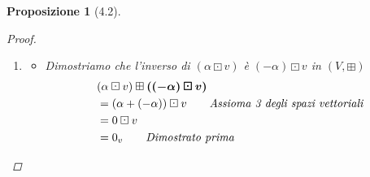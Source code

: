 \documentclass[11pt,a4paper]{article}
\theoremstyle{manuale}
\newtheorem*{proposizione}{Proposizione}
\theoremstyle{manualecorsivo}
\newcommand{\motivo}[1]{\tag*{\textit{#1}}}
\begin{document}
\begin{proposizione}[4.2]
\begin{proof}
\begin{enumerate}[label=\roman*)]
				Adesso dimostriamo che $\alpha \boxdot 0_v = 0_v$ \\
				\begin{align*}
					&\alpha \boxdot v \\
					& = \alpha \boxdot (v \boxplus 0_v) \motivo{$0_v$ è elemento neutro per def.} \\
					& = (\alpha \boxdot v) \boxplus (\alpha \boxdot 0_v) \motivo{Assioma 3 degli spazi vettoriali} \\
					& = (\alpha \boxdot 0_v) \boxplus (\alpha \boxdot v)  \motivo{$(V,\boxplus)$ è un gruppo abeliano}
				\end{align*}
				Ciò implica che $\alpha \boxdot v = (\alpha \boxdot v) \boxplus (\alpha \boxdot 0_v) = (\alpha \boxdot 0_v) \boxplus (\alpha \boxdot v) $. Pertanto $\alpha \boxdot 0_v$ rispetta la definizione di elemento neutro per $(V, \boxplus)$, dunque equivale a $0_v$ \\
				\textbf{($\Rightarrow$)}\\
				Dunque dimostriamo che $\alpha \boxdot v = 0_v$ implica che $\alpha = 0$ oppure $v = 0_v$. Per farlo notiamo che $K \Rightarrow (P \lor Q)$ è equivalente a dimostrare $K \Rightarrow (\neg P \Rightarrow Q) $. Quindi basta dimostrare che $\alpha \neq 0 \Rightarrow v = 0_v$: \\
 				Se $\alpha \neq 0$ allora si ha che $v = 1 \boxdot  v = \underbrace{(\alpha^{-1} \cdot \alpha) \boxdot v = \alpha^{-1} \boxdot (\alpha \boxdot v)}_{\text{Assioma 4}}  = \alpha^{-1} \boxdot 0_v = 0_v$ \\
				
				\item 
				
				\begin{itemize}
					
					\item Dimostriamo che l'inverso di  $(\alpha \boxdot v)$ è $(- \alpha) \boxdot v$ in $(V, \boxplus)$ \\
					\begin{align*}
						& (\alpha \boxdot v) \boxplus \boldsymbol{((- \alpha) \boxdot v)}	 \\
						& = (\alpha + (- \alpha)) \boxdot v \motivo{Assioma 3 degli spazi vettoriali} \\
						& = 0 \boxdot v \\
						& = 0_v \motivo{Dimostrato prima}
					\end{align*}
					

\end{itemize}
\end{enumerate}
\end{proof}
\end{proposizione}
\end{document}
